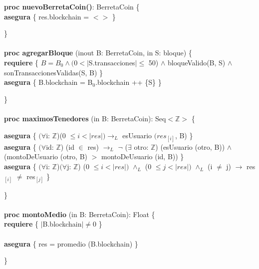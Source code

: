 \documentclass{article}
\newcommand{\Entero}{$\mathds{Z}$}
\begin{document}
    \textbf{proc nuevoBerretaCoin()}: BerretaCoin \{\\
        \indent\indent \textbf{asegura} \{ res.blockchain = $<>$ \}

    \}\\\\

    \textbf{proc agregarBloque} (inout B: BerretaCoin, in S: bloque) \{\\
        \indent\indent\textbf{requiere} \{ $B = B_0 \land (0 < |$S.transacciones$| \leq$ 50) $\land$ bloqueValido(B, S) $\land$ sonTransaccionesValidas(S, B) \}\\

        \indent\indent\textbf{asegura} \{ B.blockchain = B${_0}$.blockchain ++ \{S\} \}

    \}\\\\

    \textbf{proc maximosTenedores} (in B: BerretaCoin): Seq$<$\Entero$>$ \{

        \indent\indent\textbf{asegura} \{ $(\forall$i: \Entero)(0 $\le i < |res|) \rightarrow_{L}$
                                            esUsuario $(res_{[i]}$, B) \}\\

        \indent\indent\textbf{asegura} \{ $(\forall$id: \Entero) (id $\in$ res) $\rightarrow_{L}$
                                         $\neg$ ($\exists$ otro: \Entero) (esUsuario (otro, B)) $\land$\\
        \indent\indent\indent\indent\indent (montoDeUsuario (otro, B) $>$ montoDeUsuario (id, B)) \}\\

        \indent\indent\textbf{asegura} \{ $(\forall$i: \Entero)$(\forall$j: \Entero) (0 $\le i < |res|)$ $\land_{L}$ (0 $\le j < |res|)$ $\land_{L}$ (i $\ne$ j) $\rightarrow$ res$_{[i]}$ $\ne$ res$_{[j]}$ \}

    \}\\\\

    \textbf{proc montoMedio} (in B: BerretaCoin): Float \{\\
        \indent\indent \textbf{requiere} \{ $|$B.blockchain$| \ne 0$ \}\\\\
        \indent\indent \textbf{asegura} \{ res = promedio (B.blockchain) \}

    \}\\\\
\end{document}
